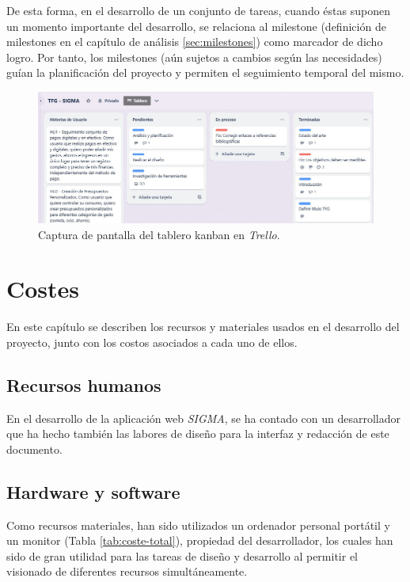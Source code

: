 De esta forma, en el desarrollo de un conjunto de tareas, cuando éstas suponen un momento importante del desarrollo, se relaciona al milestone (definición de milestones en el capítulo de análisis \ref{sec:milestones}) como marcador de dicho logro. Por tanto, los milestones (aún sujetos a cambios según las necesidades) guían la planificación del proyecto y permiten el seguimiento temporal del mismo.
\begin{figure}[ht!]
    \centering
    \includegraphics[width=\linewidth]{imagenes/tablero_kanban.jpg}
    \caption{Captura de pantalla del tablero kanban en \textit{Trello}.}
    \label{fig:tablero_kanban}
\end{figure}


\section{Costes}
En este capítulo se describen los recursos y materiales usados en el desarrollo del proyecto, junto con los costos asociados a cada uno de ellos.

\subsection{Recursos humanos}

En el desarrollo de la aplicación web \textit{SIGMA}, se ha contado con un desarrollador que ha hecho también las labores de diseño para la interfaz y redacción de este documento.

\subsection{Hardware y software}
Como recursos materiales, han sido utilizados un ordenador personal portátil y un monitor (Tabla \ref{tab:coste-total}),
propiedad del desarrollador, los cuales han sido de gran utilidad para las tareas de diseño y desarrollo al permitir el visionado de diferentes recursos simultáneamente.

